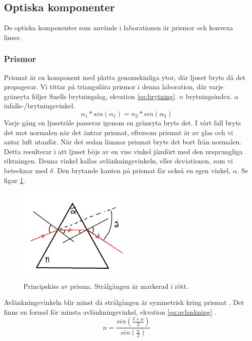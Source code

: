 \documentclass[a4paper]{article}
\begin{document}
\subsection{Optiska komponenter}
De optiska komponenter som används i laborationen är prismor och konvexa linser.
\subsubsection{Prismor}
Prismat är en komponent med platta genomskinliga ytor, där ljuset bryts då det propagerar. Vi tittar på triangulära prismor i denna laboration,
där varje gränsyta följer Snells brytningslag, ekvation \ref{eq:brytning}\cite[p.202]{vl}. $n$ brytningsindex. $\alpha$ infalls-/brytningsvinkel.
\begin{equation}
    n_1*sin(\alpha_1) = n_2*sin(\alpha_2)
    \label{eq:brytning}
\end{equation}
Varje gång en ljusstråle passerar igenom en gränsyta bryts det. I vårt fall bryts det mot normalen när det äntrar prismat, eftersom prismat är av glas och vi antar luft utanför.
När det sedan lämnar prismat bryts det bort från normalen. Detta resulterar i att ljuset böjs av en viss vinkel jämfört med den ursprungliga riktningen. Denna vinkel kallas
avlänkningsvinkeln, eller deviationen, som vi betecknar med $\delta$. Den brytande kanten på prismat får också en egen vinkel, $\alpha$. Se figur \ref{fig:prism}.
\begin{figure}[h!]
    \centering
    \includegraphics[width=0.5\textwidth]{prism.png}
    \caption{Principskiss av prisma. Strålgången är markerad i rött.}
    \label{fig:prism}
\end{figure}
Avlänkningsvinkeln blir minst då strålgången är symmetrisk kring prismat \cite[p.210-211]{vl}. Det finns en formel för minsta avlänkningsvinkel, ekvation \ref{eq:avlankning} \cite[p.212]{vl}.
\begin{equation}
    n = \frac{sin(\frac{\delta +\alpha}{2})}{sin(\frac{\alpha}{2})}
    \label{eq:avlankning}
\end{equation}
\end{document}
